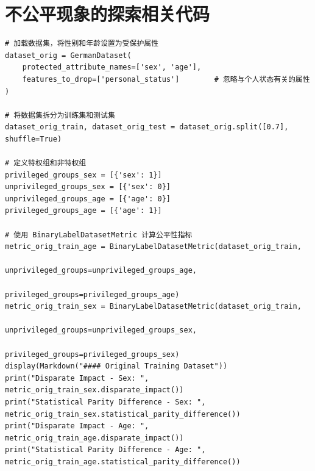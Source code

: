 \documentclass{article}
\begin{document}
\section{不公平现象的探索相关代码}
\begin{lstlisting}
# 加载数据集，将性别和年龄设置为受保护属性
dataset_orig = GermanDataset(
    protected_attribute_names=['sex', 'age'],
    features_to_drop=['personal_status']        # 忽略与个人状态有关的属性
)

# 将数据集拆分为训练集和测试集
dataset_orig_train, dataset_orig_test = dataset_orig.split([0.7], shuffle=True)

# 定义特权组和非特权组
privileged_groups_sex = [{'sex': 1}]
unprivileged_groups_sex = [{'sex': 0}]
unprivileged_groups_age = [{'age': 0}]
privileged_groups_age = [{'age': 1}]

# 使用 BinaryLabelDatasetMetric 计算公平性指标
metric_orig_train_age = BinaryLabelDatasetMetric(dataset_orig_train, 
                                             unprivileged_groups=unprivileged_groups_age,
                                             privileged_groups=privileged_groups_age)
metric_orig_train_sex = BinaryLabelDatasetMetric(dataset_orig_train, 
                                             unprivileged_groups=unprivileged_groups_sex,
                                             privileged_groups=privileged_groups_sex)
display(Markdown("#### Original Training Dataset"))
print("Disparate Impact - Sex: ", metric_orig_train_sex.disparate_impact())
print("Statistical Parity Difference - Sex: ", metric_orig_train_sex.statistical_parity_difference())
print("Disparate Impact - Age: ", metric_orig_train_age.disparate_impact())
print("Statistical Parity Difference - Age: ", metric_orig_train_age.statistical_parity_difference())
\end{lstlisting}
\end{document}
